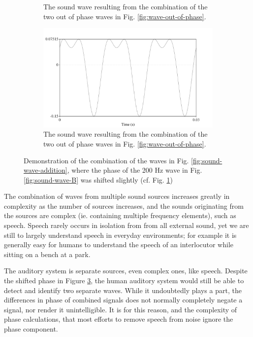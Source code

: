 \begin{figure}[h!]
\begin{subfigure}{0.5\textwidth}
  \caption{The sound wave resulting from the combination of the two out of phase waves in Fig. \ref{fig:wave-out-of-phase}.}
  \label{fig:wave-addition-200hz-shifted}
\end{subfigure}
%
\begin{center}
\begin{subfigure}{0.5\textwidth}
  \includegraphics[width=\textwidth]{figure/sound-combined-shifted-phase.png}
  \caption{The sound wave resulting from the combination of the two out of phase waves in Fig. \ref{fig:wave-out-of-phase}.}
  \label{fig:sound-combined-shifted-phase}
\end{subfigure}
\end{center}
\caption{Demonstration of the combination of the \DIFdelbeginFL {}\DIFdelendFL waves \DIFdelbeginFL {}\DIFdelendFL in Fig. \ref{fig:sound-wave-addition}, where the phase of the 200 Hz wave in Fig. \ref{fig:sound-wave-B} was shifted slightly (cf. Fig. \ref{fig:wave-addition-200hz-shifted})}
\label{fig:sound-shifted-phase}
\end{figure}

The combination of waves from multiple sound sources increases greatly in complexity as the number of sources increases, and the sounds originating from the sources are complex (ie. containing multiple frequency elements), such as speech.  Speech rarely occurs in isolation from from all external sound, yet we are still \DIFaddbegin {}\DIFaddend to largely understand speech in everyday environments; for example it is generally easy for humans to understand the speech of an interlocutor while sitting on a bench at a park.

The auditory system is \DIFdelbegin {}\DIFdelend \DIFaddbegin {}\DIFaddend separate sources, even complex ones, like speech. Despite the shifted phase in Figure \ref{fig:sound-shifted-phase}, the human auditory system would still be able to detect and identify two separate waves.  While it undoubtedly plays a part, the differences in phase of combined signals does not normally completely negate a signal, nor render it unintelligible.  It is for this reason, and the complexity of phase calculations, that most efforts to remove speech from noise ignore the phase component.

